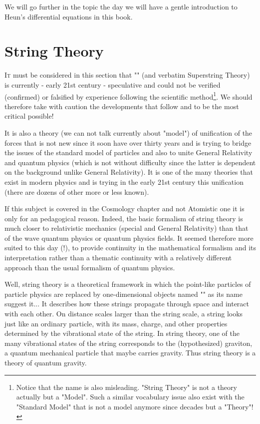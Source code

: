 	We will go further in the topic the day we will have a gentle introduction to Heun's differential equations in this book.

	\newpage
	\thispagestyle{empty}
	\mbox{}
	\section{String Theory}\label{string theory}
	\lettrine[lines=4]{\color{BrickRed}I}t must be considered in this section that "" (and verbatim Superstring Theory) is currently - early 21st century - speculative and could not be verified (confirmed) or falsified by experience following the scientific method\footnote{Notice that the name is also misleading. "String Theory" is not a theory actually but a "Model". Such a similar vocabulary issue also exist with the "Standard Model" that is not a model anymore since decades but a "Theory"!}. We should therefore take with caution the developments that follow and to be the most critical possible!
	
	It is also a theory (we can not talk currently about "model") of unification of the forces that is not new since it soon have over thirty years and is trying to bridge the issues of the standard model of particles and also to unite General Relativity and quantum physics (which is not without difficulty since the latter is dependent on the background unlike General Relativity). It is one of the many theories that exist in modern physics and is trying in the early 21st century this unification (there are dozens of other more or less known).
	
	\begin{tcolorbox}[title=Remark,colframe=black,arc=10pt]
	If this subject is covered in the Cosmology chapter and not Atomistic one it is only for an pedagogical reason. Indeed, the basic formalism of string theory is much closer to relativistic mechanics (special and General Relativity) than that of the wave quantum physics or quantum physics fields. It seemed therefore more suited to this day (!), to provide continuity in the mathematical formalism and its interpretation rather than a thematic continuity with a relatively different approach than the usual formalism of quantum physics.
	\end{tcolorbox}
	
	Well, string theory is a theoretical framework in which the point-like particles of particle physics are replaced by one-dimensional objects named "" as its name suggest it... It describes how these strings propagate through space and interact with each other. On distance scales larger than the string scale, a string looks just like an ordinary particle, with its mass, charge, and other properties determined by the vibrational state of the string. In string theory, one of the many vibrational states of the string corresponds to the (hypothesized) graviton, a quantum mechanical particle that maybe carries gravity. Thus string theory is a theory of quantum gravity.

